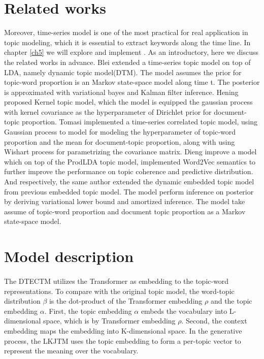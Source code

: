 \section{Related works}
Moreover, time-series model is one of the most practical for real application in topic modeling, which it is essential to extract keywords along the time line. In chapter \ref{ch5} we will explore and implement . As an introductory, here we discuss the related works in advance.
Blei \cite{blei_dynamic_2006} extended a time-series topic model on top of LDA, namely dynamic topic model(DTM). The model assumes the prior for topic-word proportion is an Markov state-space model along time t. The posterior is approximated with variational bayes and Kalman filter inference.
Hening\cite{hennig_kernel_2012} proposed Kernel topic model, which the model is equipped the gaussian process with kernel covariance as the hyperparameter of Dirichlet prior for document-topic proportion.
Tomasi\cite{tomasi_stochastic_nodate} implemented a time-series correlated topic model, using Gaussian process to model for modeling the hyperparameter of topic-word proportion and the mean for document-topic proportion, along with using Wishart process for parametrizing the covariance matrix.
Dieng\cite{dieng_topic_2019} improve a model which on top of the ProdLDA topic model, implemented Word2Vec semantics to further improve the performance on topic coherence and predictive distribution. And respectively, the same author\cite{dieng_dynamic_2019} extended the dynamic embedded topic model from previous embedded topic model. The model perform inference on posterior by deriving variational lower bound and amortized inference. The model take assume of topic-word proportion and document topic proportion as a Markov state-space model.
\section{Model description}
\paragraph{}The DTECTM utilizes the Transformer as embedding to the topic-word representations. To compare with the original topic model, the word-topic distribution $ \beta $ is the dot-product of the Transformer embedding $ \rho $ and the topic embedding $ \alpha $.
First, the topic embedding $ \alpha $ embeds the vocabulary into L-dimensional space, which is by Transformer embedding $ \rho $. Second, the context embedding maps the embedding into K-dimensional space. 
In the generative process, the LKJTM uses the topic embedding to form a per-topic vector to represent the meaning over the vocabulary.

